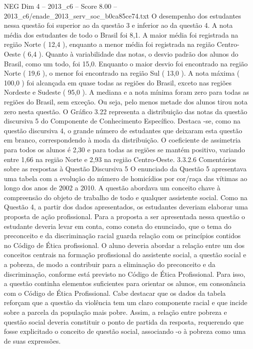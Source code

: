 \begin{textsample}{NEG Dim 4 – 2013\_c6 – Score 8.00 – 2013\_c6/enade\_2013\_serv\_soc\_b0ca85ce74.txt}
O desempenho dos estudantes nessa questão foi superior ao da questão 3 e inferior ao da questão 4.
A nota média dos estudantes de todo o Brasil foi 8,1.
A maior média foi registrada na região Norte ( 12,4 ), enquanto a menor média foi registrada na região Centro-Oeste ( 6,4 ).
Quanto à variabilidade das notas, o desvio padrão dos alunos do Brasil, como um todo, foi 15,0.
Enquanto o maior desvio foi encontrado na região Norte ( 19,6 ), o menor foi encontrado na região Sul ( 13,0 ).
A nota máxima ( 100,0 ) foi alcançada em quase todas as regiões do Brasil, exceto nas regiões Nordeste e Sudeste ( 95,0 ).
A mediana e a nota mínima foram zero para todas as regiões do Brasil, sem exceção.
Ou seja, pelo menos metade dos alunos tirou nota zero nesta questão.
O Gráfico 3.22 representa a distribuição das notas da questão discursiva 5 do Componente de Conhecimento Específico.
Destaca -se, como na questão discursiva 4, o grande número de estudantes que deixaram esta questão em branco, correspondendo à moda da distribuição.
O coeficiente de assimetria para todos os alunos é 2,30 e para todas as regiões se mantém positivo, variando entre 1,66 na região Norte e 2,93 na região Centro-Oeste. 3.3.2.6 Comentários sobre as respostas à Questão Discursiva 5 O enunciado da Questão 5 apresentava uma tabela com a evolução do número de homicídios por cor/raça das vítimas ao longo dos anos de 2002 a 2010.
A questão abordava um conceito chave à compreensão do objeto de trabalho de todo e qualquer assistente social.
Como na Questão 4, a partir dos dados apresentados, os estudantes deveriam elaborar uma proposta de ação profissional.
Para a proposta a ser apresentada nessa questão o estudante deveria levar em conta, como consta do enunciado, que o tema do preconceito e da discriminação racial guarda relação com os princípios contidos no Código de Ética profissional.
O aluno deveria abordar a relação entre um dos conceitos centrais na formação profissional do assistente social, a questão social e a pobreza, de modo a contribuir para a eliminação do preconceito e da discriminação, conforme está previsto no Código de Ética Profissional.
Para isso, a questão continha elementos suficientes para orientar os alunos, em consonância com o Código de Ética Profissional.
Cabe destacar que os dados da tabela reforçam que a questão da violência tem um claro componente racial e que incide sobre a parcela da população mais pobre.
Assim, a relação entre pobreza e questão social deveria constituir o ponto de partida da resposta, requerendo que fosse explicitado o conceito de questão social, associando -o à pobreza como uma de suas expressões.

\end{textsample}
